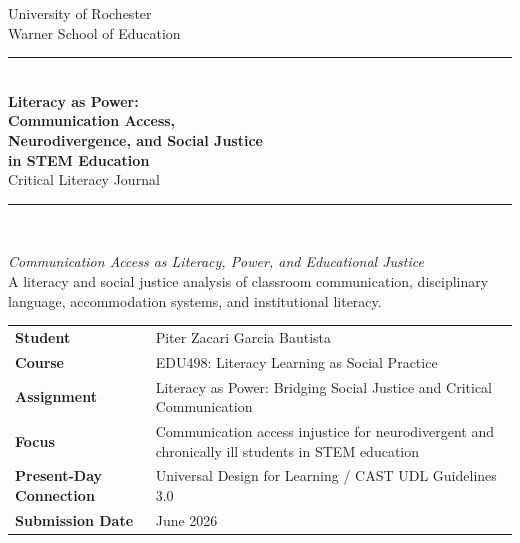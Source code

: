 \documentclass[11pt]{article}
\begin{document}
\begin{titlepage}
\thispagestyle{empty}

\begin{center}
{\large University of Rochester\\}
{\normalsize Warner School of Education\\[0.35in]}

{\color{PrimaryRed}\rule{\textwidth}{1.4pt}}\\[0.22in]
{\Huge\bfseries Literacy as Power:\\[0.08in] Communication Access,\\[0.08in] Neurodivergence, and Social Justice\\[0.08in] in STEM Education}\\[0.18in]
{\Large Critical Literacy Journal}\\[0.22in]
{\color{PrimaryRed}\rule{0.78\textwidth}{0.7pt}}\\[0.32in]

\colorbox{SoftBlue}{%
\parbox{0.88\textwidth}{%
\centering\vspace{0.12in}
\textit{Communication Access as Literacy, Power, and Educational Justice}\\[0.05in]
A literacy and social justice analysis of classroom communication, disciplinary language, accommodation systems, and institutional literacy.
\vspace{0.12in}
}%
}
\end{center}

\vspace{0.25in}

\begin{center}
\renewcommand{\arraystretch}{1.15}
\setlength{\tabcolsep}{4pt}
\begin{tabular}{>{\bfseries\RaggedLeft}p{1.65in} p{4.9in}}
Student & Piter Zacari Garcia Bautista \\
Course & EDU498: Literacy Learning as Social Practice \\
Assignment & Literacy as Power: Bridging Social Justice and Critical Communication \\
Focus & Communication access injustice for neurodivergent and chronically ill students in STEM education \\
Present-Day Connection & Universal Design for Learning / CAST UDL Guidelines 3.0 \\
Submission Date & June 2026 \\
\end{tabular}
\end{center}


\end{titlepage}
\end{document}
